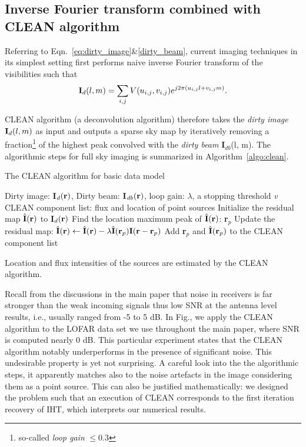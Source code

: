 \documentclass[article]{imsart}
\begin{document}
\subsection{Inverse Fourier transform combined with CLEAN algorithm}
Referring to Eqn.~\ref{eq:dirty_image}\&\ref{dirty_beam}, current imaging techniques in its simplest setting first performs naive inverse Fourier transform of the visibilities such that
\begin{equation}
{\bf I}_{d}(l, m) = \sum_{i, j} V(u_{i, j}, v_{i, j})e^{j2\pi (u_{i, j}l+v_{i, j}m)}.
\end{equation}

CLEAN algorithm (a deconvolution algorithm) therefore takes the {\it dirty image} ${\bf I}_d(l, m)$ as input and outputs a sparse sky map by iteratively removing a fraction\footnote{so-called {\it loop gain} $\leq 0.3$} of the highest peak convolved with the {\it dirty beam} {\bf I}${}_{db}$(l, m). The algorithmic steps for full sky imaging is summarized in Algorithm~\ref{algo:clean}.


\begin{algorithm}[t!]
   \caption{The CLEAN algorithm for basic data model}
   \label{algo:clean}
\begin{algorithmic}
    {Dirty image: {\bf I}${}_{d}({\bf r})$, Dirty beam: {\bf I}${}_{db}({\bf r})$, loop gain: $\lambda$, a stopping threshold {\it v}} 
    CLEAN component list: flux and location of point sources
   \REPEAT 
   \STATE Initialize the residual map $\hat{\bf I}({\bf r})$ to {\bf I}${}_{d}({\bf r})$
   \STATE Find the location maximum peak of $\hat{\bf I}({\bf r})$: {\bf r${}_p$}
   \STATE  Update the residual map: $\hat{\bf I}({\bf r}) \leftarrow \hat{\bf I}({\bf r}) - \lambda \hat{\bf I}({\bf r}_p) {\bf I}({\bf r}-{\bf r}_p)$
   \STATE Add {\bf r}${}_p$ and $\hat{\bf I}({\bf r}_p)$ to the CLEAN component list
   \ENDFOR
\end{algorithmic}
\end{algorithm}
Location and flux intensities of the sources are estimated by the CLEAN algorithm.

Recall from the discussions in the main paper that noise in receivers is far stronger than the weak incoming signals thus low SNR at the antenna level results, i.e., usually ranged from -5 to 5 dB. In Fig., we apply the CLEAN algorithm to the LOFAR data set we use throughout the main paper, where SNR is computed nearly 0 dB. This particular experiment states that the CLEAN algorithm notably underperforms in the presence of significant noise. This undesirable property is yet not surprising. A careful look into the the algorithmic steps, it apparently matches also to the noise artefacts in the image considering them as a point source. This can also be justified mathematically: we designed the problem such that an execution of {CLEAN} corresponds to the first iteration recovery of IHT, which interprets our numerical results. 
\end{document}
